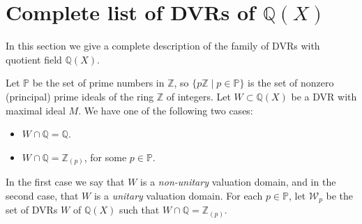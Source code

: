 \documentclass[10pt]{article}
\numberwithin{equation}{section}
\newtheorem{Cor}[equation]{Corollary}
\theoremstyle{definition}
\theoremstyle{definition}
\newcommand{\Q}{\mathbb{Q}}
\newcommand{\Z}{\mathbb{Z}}
\newcommand{\PP}{\mathbb{P}}
\begin{document}




\section{Complete list of DVRs of $\Q(X)$}\label{list DVRs}

In this section we give a complete description of the family of DVRs with quotient field $\Q(X)$.

Let $\PP$ be the set of prime numbers in $\Z$, so $\{p\Z \mid p \in \PP\}$ is the set of nonzero (principal) 
prime ideals of the ring $\Z$ of integers.
Let $W\subset\Q(X)$ be a DVR with maximal ideal $M$. We have one of the following two cases:
\begin{itemize}
\item $W\cap \Q=\Q$.
\item $W\cap \Q=\Z_{(p)}$, for some $p\in\PP$.
\end{itemize}
In the first case we say that $W$ is a \emph{non-unitary} valuation domain, and in the second case, that $W$ is a \emph{unitary} valuation domain. %
For each $p\in\PP$, let $\mathcal{W}_p$ be the set of DVRs $W$ of $\Q(X)$ such that $W \cap \Q = \Z_{(p)}$.

\end{document}
